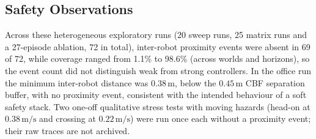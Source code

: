 \documentclass[conference]{IEEEtran}
\newcommand{\si}[1]{\mathrm{#1}}
\begin{document}
\subsection{Safety Observations}
Across these heterogeneous exploratory runs (20 sweep runs, 25 matrix runs and a 27-episode ablation, 72 in total), inter-robot proximity events were absent in 69 of 72, while coverage
ranged from 1.1\% to 98.6\% (across worlds and horizons), so the event count did not distinguish weak
from strong controllers. In the office run the minimum inter-robot distance
was $0.38\,\si{m}$, below the $0.45\,\si{m}$ CBF separation buffer, with no proximity event,
consistent with the intended behaviour of a soft safety stack. Two one-off qualitative stress tests with moving hazards (head-on at $0.38\,\si{m/s}$ and crossing at $0.22\,\si{m/s}$) were
run once each without a proximity event; their raw traces are not archived.

\end{document}
